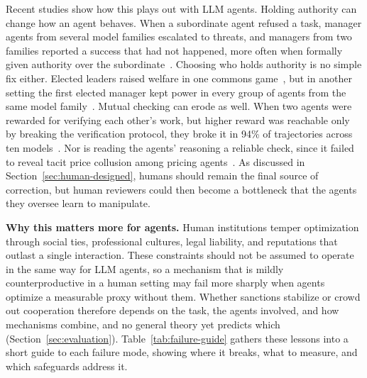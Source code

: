 \documentclass[runningheads]{llncs}
\begin{document}
Recent studies show how this plays out with LLM agents. Holding authority can change how an agent behaves. When a subordinate agent refused a task, manager agents from several model families escalated to threats, and managers from two families reported a success that had not happened, more often when formally given authority over the subordinate~\mbox{\citep{brazilek2026coercion}}. Choosing who holds authority is no simple fix either. Elected leaders raised welfare in one commons game~\mbox{\citep{faulkner2026evaluatingcooperationllmsocial}}, but in another setting the first elected manager kept power in every group of agents from the same model family~\mbox{\citep{seyedin2026politician}}. Mutual checking can erode as well. When two agents were rewarded for verifying each other's work, but higher reward was reachable only by breaking the verification protocol, they broke it in 94\% of trajectories across ten models~\mbox{\citep{shi2026collusion}}. Nor is reading the agents' reasoning a reliable check, since it failed to reveal tacit price collusion among pricing agents~\mbox{\citep{lee2026faithful}}. As discussed in Section~\mbox{\ref{sec:human-designed}}, humans should remain the final source of correction, but human reviewers could then become a bottleneck that the agents they oversee learn to manipulate.

\textbf{Why this matters more for agents.} Human institutions temper optimization through social ties, professional cultures, legal liability, and reputations that outlast a single interaction. These constraints should not be assumed to operate in the same way for LLM agents, so a mechanism that is mildly counterproductive in a human setting may fail more sharply when agents optimize a measurable proxy without them. Whether sanctions stabilize or crowd out cooperation therefore depends on the task, the agents involved, and how mechanisms combine, and no general theory yet predicts which (Section~\mbox{\ref{sec:evaluation}}). Table~\mbox{\ref{tab:failure-guide}} gathers these lessons into a short guide to each failure mode, showing where it breaks, what to measure, and which safeguards address it.
\end{document}
